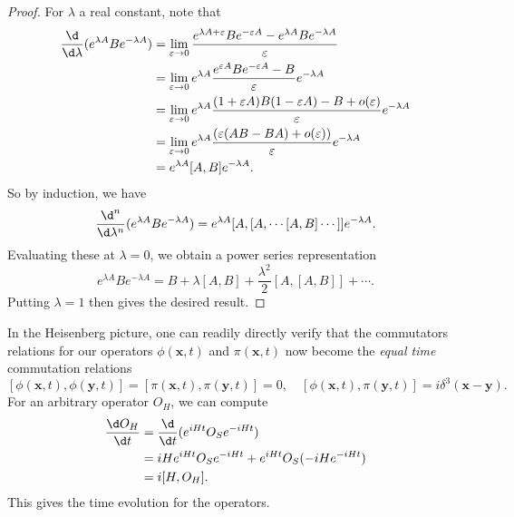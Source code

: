 \documentclass[a4paper]{article}
\begin{document}
\begin{proof}
  For $\lambda$ a real constant, note that
  \begin{align*}
    \frac{\d}{\d \lambda} (e^{\lambda A}B e^{-\lambda A}) &= \lim_{\varepsilon \to 0} \frac{e^{\lambda A + \varepsilon} B e^{-\varepsilon A} - e^{\lambda A}Be^{-\lambda A}}{\varepsilon}\\
    &= \lim_{\varepsilon \to 0} e^{\lambda A}\frac{e^{\varepsilon A}B e^{-\varepsilon A}- B}{\varepsilon} e^{-\lambda A}\\
    &= \lim_{\varepsilon \to 0} e^{\lambda A}\frac{(1 + \varepsilon A)B(1 - \varepsilon A) - B + o(\varepsilon)}{\varepsilon} e^{-\lambda A}\\
    &= \lim_{\varepsilon \to 0} e^{\lambda A} \frac{(\varepsilon (AB - BA) + o(\varepsilon))}{\varepsilon}e^{-\lambda A}\\
    &= e^{\lambda A}[A, B] e^{-\lambda A}.
  \end{align*}
  So by induction, we have
  \[
    \frac{\d^n}{\d \lambda^n}(e^{\lambda A}B e^{-\lambda A}) = e^{\lambda A} [A, [A, \cdots[A, B]\cdots]]e^{-\lambda A}.
  \]
  Evaluating these at $\lambda = 0$, we obtain a power series representation
  \[
    e^{\lambda A}B e^{-\lambda A} = B + \lambda [A, B] + \frac{\lambda^2}{2}[A, [A, B]] + \cdots.
  \]
  Putting $\lambda = 1$ then gives the desired result.
\end{proof}
In the Heisenberg picture, one can readily directly verify that the commutators relations for our operators $\phi(\mathbf{x}, t)$ and $\pi(\mathbf{x}, t)$ now become the \emph{equal time} commutation relations
\[
  [\phi(\mathbf{x}, t), \phi(\mathbf{y}, t)] = [\pi(\mathbf{x}, t), \pi(\mathbf{y}, t)] = 0,\quad [\phi(\mathbf{x}, t), \pi(\mathbf{y}, t)] = i \delta^3(\mathbf{x} - \mathbf{y}).
\]
For an arbitrary operator $O_H$, we can compute
\begin{align*}
  \frac{\d O_H}{\d t} &= \frac{\d}{\d t}(e^{iHt}O_S e^{-iHt})\\
  &= iH e^{iHt}O_Se^{-iHt} + e^{iHt}O_S (-iH e^{-iHt})\\
  &= i[H, O_H].
\end{align*}
This gives the time evolution for the operators.
\end{document}
